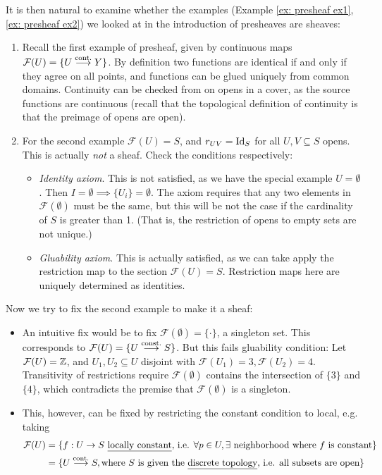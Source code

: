 \documentclass{article}
\begin{document}
\begin{example}
    It is then natural to examine whether the examples (Example \ref{ex: presheaf ex1}, \ref{ex: presheaf ex2}) we looked at in the introduction of presheaves are sheaves:
    \begin{enumerate}
        \item Recall the first example of presheaf, given by continuous maps $\mathcal{F}(U) = \{ U \overset{\text{cont.}}{\longrightarrow} Y \}$. By definition two functions are identical if and only if they agree on all points, and functions can be glued uniquely from common domains. Continuity can be checked from on opens in a cover, as the source functions are continuous (recall that the topological definition of continuity is that the preimage of opens are open).
        \item For the second example $\mathcal{F}(U) = S$, and $r_{UV} = \mathrm{Id}_S$ for all $U, V \subseteq S$ opens. This is actually \emph{not} a sheaf. Check the conditions respectively:
        \begin{itemize}
            \item \emph{Identity axiom}. This is not satisfied, as we have the special example $U = \emptyset$. Then $I = \emptyset \implies \{ U_i \} = \emptyset$. The axiom requires that any two elements in $\mathcal{F}(\emptyset)$ must be the same, but this will be not the case if the cardinality of $S$ is greater than 1. (That is, the restriction of opens to empty sets are not unique.)
            \item \emph{Gluability axiom}. This is actually satisfied, as we can take apply the restriction map to the section $\mathcal{F}(U) = S$. Restriction maps here are uniquely determined as identities.
        \end{itemize}
    \end{enumerate}

    Now we try to fix the second example to make it a sheaf: 
    \begin{itemize}
        \item An intuitive fix would be to fix $\mathcal{F}(\emptyset) = \{ \cdot \}$, a singleton set. This corresponds to $\mathcal{F}(U) = \{ U \overset{\text{const.}}{\longrightarrow} S \}$. But this fails gluability condition: Let $\mathcal{F}(U) = \mathbb{Z}$, and $U_1, U_2 \subseteq U$ disjoint with $\mathcal{F}(U_1) = 3, \mathcal{F}(U_2) = 4$. Transitivity of restrictions require $\mathcal{F}(\emptyset)$ contains the intersection of $\{3\}$ and $\{4\}$, which contradicts the premise that $\mathcal{F}(\emptyset)$ is a singleton.
        \item This, however, can be fixed by restricting the constant condition to local, e.g. taking
        \begin{align*}
            \mathcal{F}(U)
            & = \{ f: U \to S \text{ \underline{locally constant}, i.e. } \forall p \in U, \exists \text{ neighborhood where $f$ is constant} \} \\
            & = \{ U \overset{\text{cont.}}{\longrightarrow} S, \text{where $S$ is given the \underline{discrete topology}, i.e. all subsets are open} \}
        \end{align*}
    \end{itemize}
    \ 
\end{example}
\end{document}
